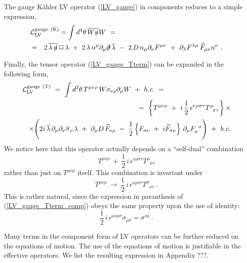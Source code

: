 \documentclass[paper,12pt]{revtex4}
\newcommand{\slashed}[1]{\hbox{{$#1$}\llap{$/$}}}
\begin{document}
	The gauge K\"ahler LV operator (\ref{LV_gauge}) in
	components reduces to a simple expression,
\begin{eqnarray}
\label{LV_gauge_comp}
\lefteqn{
	\mathcal{L}_{\mathrm{LV}}^{\mathrm{gauge\ (K)}} =  
	\int d^4\theta \, \overline{W \slashed{n}}W ~=~
	} \\
\nonumber
	& = &
	2\, \overline{\lambda\,\slashed{n}}\, \Box\, 
	   \lambda 
	~+~
	2\, \lambda\, n^\mu \partial_\mu \slashed{\partial}\, 
	   \overline{\lambda} 
	~-~ 
	2\, D\, n_\mu \partial_\nu F^{\mu\nu}
	~+~ 
	\partial_\lambda F^{\lambda\mu}\, 
	\widetilde{F}_{\mu\nu}  n^\nu
	~.
\end{eqnarray}

	Finally, the tensor operator (\ref{LV_gauge_Tterm}) can be expanded in the following form,
\begin{eqnarray}
\nonumber
\lefteqn{
	\mathcal{L}_{\mathrm{LV}}^{\mathrm{gauge\ (T)}}  ~=~ 
	\int d^2\theta \, T^{\mu\nu\rho} \,
	        W \sigma_{\nu\rho} \partial_\mu W  ~+~ h.c. ~=~ } \\
	&&
\label{LV_gauge_Tterm_comp}	
	\quad
	=~
	\left\{ T^{\mu\nu\rho} 
		~+~ 
	       i\,\frac{1}{2}\,\epsilon^{\nu\rho\sigma\tau}
	       T^\mu_{\phantom{\mu}\sigma\tau} \right\} \times 
	\\
\nonumber
	&&
	\times
	\Biggl(
	     2i\, \overline{\lambda}\, \partial_\mu\partial_\nu
	     \overline{\sigma}_\rho\, \lambda 
		~+~
		\partial_\mu D\, \widetilde{F}_{\nu\rho}
		~-~
		\frac{1}{2}
		\left\{
			F_{\sigma\nu} ~+~ 
			i \widetilde{F}_{\sigma\nu}
		\right\}\, 
		\partial_\mu F_\rho^{\phantom{\rho}\sigma}
	\Biggr) 
	~+~ h.c.
\end{eqnarray}
	We notice here that this operator actually depends on
	a ``self-dual'' combination
\[
	T^{\mu\nu\rho} 
	~+~ 
	\frac{1}{2}\,i\,\epsilon^{\nu\rho\sigma\tau}
	T^\mu_{\phantom{\mu}\sigma\tau} 
\]
	rather than just on $ T^{\mu\nu\rho} $ itself. 
	This combination is invariant under
\[
	T^{\mu\nu\rho} 
	~\to~
	\frac{1}{2}\,i\,\epsilon^{\nu\rho\sigma\tau}
	T^\mu_{\phantom{\mu}\sigma\tau} 
	~.
\]
	This is rather natural, since the expression in paranthesis of 
	(\ref{LV_gauge_Tterm_comp}) obeys the same property upon the use of identity:
\[
	\frac{1}{2}\,i\,\epsilon^{\mu\nu\rho\sigma}
		\sigma_{\rho\sigma} = \sigma^{\nu\rho}~.
\]
	
Many terms in the component form of LV operators can be 
further reduced on the equations of motion. The use of the 
equations of motion is justifiable in the effective operators. 
We list the resulting expression in Appendix ???. 	
	
\end{document}
